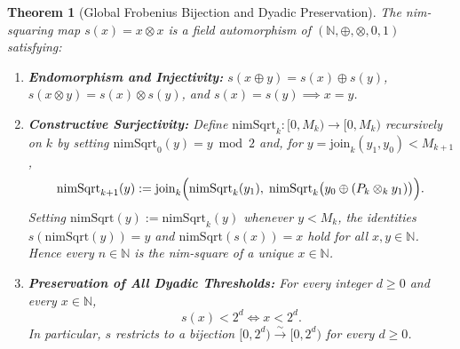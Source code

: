 \documentclass[11pt]{article}
\newtheorem{theorem}{Theorem}[section]
\theoremstyle{definition}
\theoremstyle{remark}
\newcommand{\nimadd}{\oplus}
\newcommand{\nimmul}{\otimes}
\newcommand{\N}{\mathbb{N}}
\begin{document}
\begin{theorem}[Global Frobenius Bijection and Dyadic Preservation]\label{thm:frobenius}
The nim-squaring map $s(x) = x \nimmul x$ is a field automorphism of $(\N, \nimadd, \nimmul, 0, 1)$ satisfying:
\begin{enumerate}
  \item \textbf{Endomorphism and Injectivity:} $s(x \nimadd y) = s(x) \nimadd s(y)$, $s(x \nimmul y) = s(x) \nimmul s(y)$, and $s(x) = s(y) \implies x = y$.
  \item \textbf{Constructive Surjectivity:} Define $\mathrm{nimSqrt}_k : [0, M_k) \to [0, M_k)$ recursively on $k$ by setting $\mathrm{nimSqrt}_0(y) = y \bmod 2$ and, for $y = \mathrm{join}_k(y_1, y_0) < M_{k+1}$,
  \[
    \mathrm{nimSqrt}_{k+1}(y) := \mathrm{join}_k\Bigl(\mathrm{nimSqrt}_k(y_1),\; \mathrm{nimSqrt}_k\bigl(y_0 \nimadd (P_k \nimmul_k y_1)\bigr)\Bigr).
  \]
  Setting $\mathrm{nimSqrt}(y) := \mathrm{nimSqrt}_k(y)$ whenever $y < M_k$, the identities $s(\mathrm{nimSqrt}(y)) = y$ and $\mathrm{nimSqrt}(s(x)) = x$ hold for all $x, y \in \N$. Hence every $n \in \N$ is the nim-square of a unique $x \in \N$.
  \item \textbf{Preservation of All Dyadic Thresholds:} For \emph{every} integer $d \ge 0$ and every $x \in \N$,
  \begin{equation}\label{eq:dyadic-preserve}
    s(x) < 2^d \iff x < 2^d.
  \end{equation}
  In particular, $s$ restricts to a bijection $[0, 2^d) \xrightarrow{\sim} [0, 2^d)$ for every $d \ge 0$.
\end{enumerate}
\end{theorem}
\end{document}
